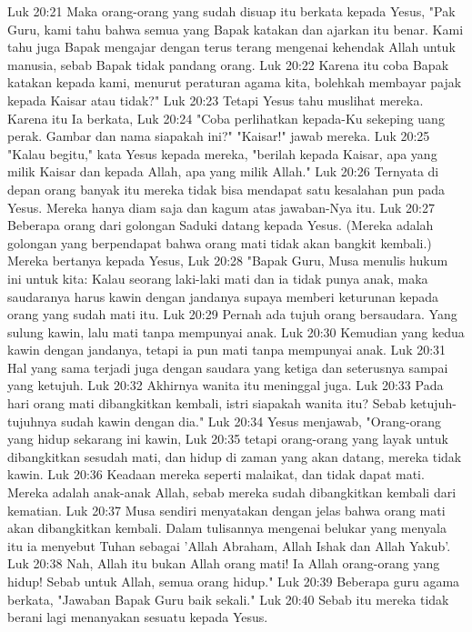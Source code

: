 Luk 20:21  Maka orang-orang yang sudah disuap itu berkata kepada Yesus, "Pak Guru, kami tahu bahwa semua yang Bapak katakan dan ajarkan itu benar. Kami tahu juga Bapak mengajar dengan terus terang mengenai kehendak Allah untuk manusia, sebab Bapak tidak pandang orang.
Luk 20:22  Karena itu coba Bapak katakan kepada kami, menurut peraturan agama kita, bolehkah membayar pajak kepada Kaisar atau tidak?"
Luk 20:23  Tetapi Yesus tahu muslihat mereka. Karena itu Ia berkata,
Luk 20:24  "Coba perlihatkan kepada-Ku sekeping uang perak. Gambar dan nama siapakah ini?" "Kaisar!" jawab mereka.
Luk 20:25  "Kalau begitu," kata Yesus kepada mereka, "berilah kepada Kaisar, apa yang milik Kaisar dan kepada Allah, apa yang milik Allah."
Luk 20:26  Ternyata di depan orang banyak itu mereka tidak bisa mendapat satu kesalahan pun pada Yesus. Mereka hanya diam saja dan kagum atas jawaban-Nya itu.
Luk 20:27  Beberapa orang dari golongan Saduki datang kepada Yesus. (Mereka adalah golongan yang berpendapat bahwa orang mati tidak akan bangkit kembali.) Mereka bertanya kepada Yesus,
Luk 20:28  "Bapak Guru, Musa menulis hukum ini untuk kita: Kalau seorang laki-laki mati dan ia tidak punya anak, maka saudaranya harus kawin dengan jandanya supaya memberi keturunan kepada orang yang sudah mati itu.
Luk 20:29  Pernah ada tujuh orang bersaudara. Yang sulung kawin, lalu mati tanpa mempunyai anak.
Luk 20:30  Kemudian yang kedua kawin dengan jandanya, tetapi ia pun mati tanpa mempunyai anak.
Luk 20:31  Hal yang sama terjadi juga dengan saudara yang ketiga dan seterusnya sampai yang ketujuh.
Luk 20:32  Akhirnya wanita itu meninggal juga.
Luk 20:33  Pada hari orang mati dibangkitkan kembali, istri siapakah wanita itu? Sebab ketujuh-tujuhnya sudah kawin dengan dia."
Luk 20:34  Yesus menjawab, "Orang-orang yang hidup sekarang ini kawin,
Luk 20:35  tetapi orang-orang yang layak untuk dibangkitkan sesudah mati, dan hidup di zaman yang akan datang, mereka tidak kawin.
Luk 20:36  Keadaan mereka seperti malaikat, dan tidak dapat mati. Mereka adalah anak-anak Allah, sebab mereka sudah dibangkitkan kembali dari kematian.
Luk 20:37  Musa sendiri menyatakan dengan jelas bahwa orang mati akan dibangkitkan kembali. Dalam tulisannya mengenai belukar yang menyala itu ia menyebut Tuhan sebagai 'Allah Abraham, Allah Ishak dan Allah Yakub'.
Luk 20:38  Nah, Allah itu bukan Allah orang mati! Ia Allah orang-orang yang hidup! Sebab untuk Allah, semua orang hidup."
Luk 20:39  Beberapa guru agama berkata, "Jawaban Bapak Guru baik sekali."
Luk 20:40  Sebab itu mereka tidak berani lagi menanyakan sesuatu kepada Yesus.
